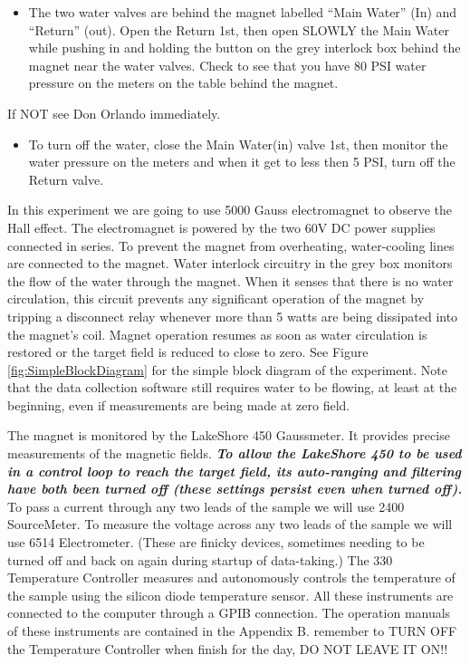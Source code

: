 \documentclass{../lab}
\begin{document}
\begin{itemize}
    \item The two water valves are behind the magnet labelled ``Main Water'' (In) and ``Return'' (out). Open the Return 1st, then open SLOWLY the Main Water while pushing in and holding the button on the grey interlock box behind the magnet near the water valves. Check to see that you have 80 PSI water pressure on the meters on the table behind the magnet.
\end{itemize}

If NOT see Don Orlando immediately.

\begin{itemize}
    \item To turn off the water, close the Main Water(in) valve 1st, then monitor the water pressure on the meters and when it get to less then 5 PSI, turn off the Return valve.
\end{itemize}

In this experiment we are going to use 5000 Gauss electromagnet to observe the Hall effect. The electromagnet is powered by the two 60V DC power supplies connected in series. To prevent the magnet from overheating, water-cooling lines are connected to the magnet. Water interlock circuitry in the grey box monitors the flow of the water through the magnet. When it senses that there is no water circulation, this circuit prevents any significant operation of the magnet by tripping a disconnect relay whenever more than 5 watts are being dissipated into the magnet's coil. Magnet operation resumes as soon as water circulation is restored or the target field is reduced to close to zero. See Figure \ref{fig:SimpleBlockDiagram} for the simple block diagram of the experiment. Note that the data collection software still requires water to be flowing, at least at the beginning, even if measurements are being made at zero field.

The magnet is monitored by the LakeShore 450 Gaussmeter. It provides precise measurements of the magnetic fields. \emph{\textbf{To allow the LakeShore 450 to be used in a control loop to reach the target field, its auto-ranging and filtering have both been turned off (these settings persist even when turned off).}} To pass a current through any two leads of the sample we will use 2400 SourceMeter. To measure the voltage across any two leads of the sample we will use 6514 Electrometer. (These are finicky devices, sometimes needing to be turned off and back on again during startup of data-taking.) The 330 Temperature Controller measures and autonomously controls the temperature of the sample using the silicon diode temperature sensor. All these instruments are connected to the computer through a GPIB connection. The operation manuals of these instruments are contained in the Appendix B. {remember to TURN OFF the Temperature Controller when finish for the day, DO NOT LEAVE IT ON!!}
\end{document}
